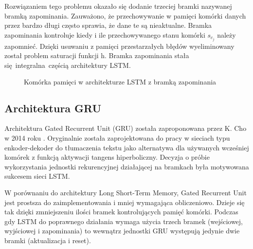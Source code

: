\documentclass[10pt,a4paper]{article}
\begin{document}
Rozwiązaniem tego problemu okazało się dodanie trzeciej bramki nazywanej bramką zapominania. Zauważono, że przechowywanie w pamięci komórki danych przez bardzo długi często sprawia, że dane te są nieaktualne. Bramka zapominania kontroluje kiedy i ile przechowywanego stanu komórki $s_{c_j}$ należy zapomnieć. Dzięki usuwaniu z pamięci przestarzałych błędów wyeliminowany został problem saturacji funkcji h. Bramka zapominania stała się integralna częścią architektury LSTM. 

\begin{figure}[!ht]
	\centering
	\caption{Komórka pamięci w architekturze LSTM z bramką zapominania}
\end{figure}
\FloatBarrier
\newpage
\subsection{Architektura GRU}

Architektura Gated Recurrent Unit (GRU) została zaproponowana przez K. Cho w 2014 roku \cite{https://doi.org/10.48550/arxiv.1406.1078}. Oryginalnie została zaprojektowana do pracy w sieciach typu enkoder-dekoder do tłumaczenia tekstu jako alternatywa dla używanych wcześniej komórek z funkcją aktywacji tangens hiperboliczny. Decyzja o próbie wykorzystania jednostki rekurencyjnej działającej na bramkach była motywowana sukcesem sieci LSTM.

W porównaniu do architektury Long Short-Term Memory, Gated Recurrent Unit jest prostsza do zaimplementowania i mniej wymagająca obliczeniowo. Dzieje się tak dzięki zmniejszeniu ilości bramek kontrolujących pamięć komórki. Podczas gdy LSTM do poprawnego działania wymaga użycia trzech bramek (wejściowej, wyjściowej i zapominania) to wewnątrz jednostki GRU występują jedynie dwie bramki (aktualizacja i reset). 
\end{document}
